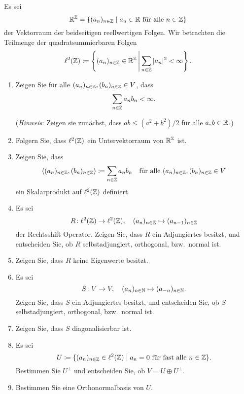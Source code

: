 \begin{question}[subtitle = Beispiele und Gegenbeispiele auf $\ell^2(\Zbb)$]{2}
  Es sei
  \[
    \mathbb{R}^{\mathbb{Z}} = \{(a_n)_{n \in \mathbb{Z}} \mid \text{$a_n \in \mathbb{R}$ für alle $n \in \mathbb{Z}$}\}
  \]
  der Vektorraum der beidseitigen reellwertigen Folgen.
  Wir betrachten die Teilmenge der quadratsummierbaren Folgen
  \[
    \ell^2(\mathbb{Z}) \coloneqq
    \left\{
      (a_n)_{n \in \mathbb{Z}} \in \mathbb{R}^{\mathbb{Z}}
    \,\middle|\,
      \sum_{n \in \mathbb{Z}} |a_n|^2 < \infty
   \right\}.
  \]
  \begin{enumerate}[leftmargin=*]
    \item
      Zeigen Sie für alle $(a_n)_{n \in \mathbb{Z}}, (b_n)_{n \in \mathbb{Z}} \in V$, dass
      \[
        \sum_{n \in \mathbb{Z}} a_n b_n < \infty.
      \]
      
      (\emph{Hinweis}:
       Zeigen sie zunächst, dass $ab \leq (a^2 + b^2)/2$ für alle $a, b \in \mathbb{R}$.)
    \item
      Folgern Sie, dass $\ell^2(\Zbb)$ ein Untervektorraum von $\mathbb{R}^{\mathbb{Z}}$ ist.
    \item
      Zeigen Sie, dass
      \[
                  \left\langle  (a_n)_{n \in \mathbb{Z}}, (b_n)_{n \in \mathbb{Z}}  \right\rangle
        \coloneqq \sum_{n \in \mathbb{Z}} a_n b_n
        \quad
        \text{für alle $(a_n)_{n \in \mathbb{Z}}, (b_n)_{n \in \mathbb{Z}} \in V$}
      \]
      ein Skalarprodukt auf $\ell^2(\Zbb)$ definiert.
    \item
      Es sei
      \[
        R \colon \ell^2(\mathbb{Z}) \to \ell^2(\mathbb{Z}),
        \quad
        (a_n)_{n \in \mathbb{Z}} \mapsto (a_{n-1})_{n \in \mathbb{Z}}
      \]
      der Rechtsshift-Operator.
      Zeigen Sie, dass $R$ ein Adjungiertes besitzt, und entscheiden Sie, ob $R$ selbstadjungiert, orthogonal, bzw.\ normal ist.
    \item
      Zeigen Sie, dass $R$ keine Eigenwerte besitzt.
    \item
      Es sei
      \[
        S \colon V \to V,
        \quad
        (a_n)_{n \in \mathbb{N}} \mapsto (a_{-n})_{n \in \mathbb{N}}.
      \]
      Zeigen Sie, dass $S$ ein Adjungiertes besitzt, und entscheiden Sie, ob $S$ selbstadjungiert, orthogonal, bzw.\ normal ist.
    \item
      Zeigen Sie, dass $S$ diagonalisierbar ist.
    \item
      Es sei
      \[
        U \coloneqq \{(a_n)_{n \in \mathbb{Z}} \in \ell^2(\mathbb{Z}) \mid \text{$a_n = 0$ für fast alle $n \in \mathbb{Z}$}\}.
      \]
      Bestimmen Sie $U^\perp$ und entscheiden Sie, ob $V = U \oplus U^\perp$.
    \item
      Bestimmen Sie eine Orthonormalbasis von $U$.
  \end{enumerate}
\end{question}


